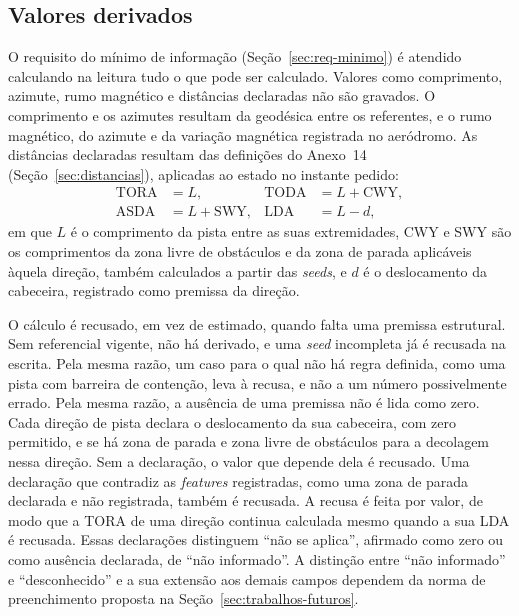 \subsection{Valores derivados}\label{sec:derivados}

O requisito do mínimo de informação (Seção~\ref{sec:req-minimo}) é atendido calculando na leitura tudo o que pode ser calculado. Valores como comprimento, azimute, rumo magnético e distâncias declaradas não são gravados. O comprimento e os azimutes resultam da geodésica entre os referentes, e o rumo magnético, do azimute e da variação magnética registrada no aeródromo. As distâncias declaradas resultam das definições do Anexo~14 (Seção~\ref{sec:distancias}), aplicadas ao estado no instante pedido:
\begin{equation}
    \begin{aligned}
        \mathrm{TORA} &= L, & \mathrm{TODA} &= L + \mathrm{CWY},\\
        \mathrm{ASDA} &= L + \mathrm{SWY}, & \mathrm{LDA} &= L - d,
    \end{aligned}
    \label{eq:distancias-declaradas}
\end{equation}
em que $L$ é o comprimento da pista entre as suas extremidades, CWY e SWY são os comprimentos da zona livre de obstáculos e da zona de parada aplicáveis àquela direção, também calculados a partir das \textit{seeds}, e $d$ é o deslocamento da cabeceira, registrado como premissa da direção.

O cálculo é recusado, em vez de estimado, quando falta uma premissa estrutural. Sem referencial vigente, não há derivado, e uma \textit{seed} incompleta já é recusada na escrita. Pela mesma razão, um caso para o qual não há regra definida, como uma pista com barreira de contenção, leva à recusa, e não a um número possivelmente errado. Pela mesma razão, a ausência de uma premissa não é lida como zero. Cada direção de pista declara o deslocamento da sua cabeceira, com zero permitido, e se há zona de parada e zona livre de obstáculos para a decolagem nessa direção. Sem a declaração, o valor que depende dela é recusado. Uma declaração que contradiz as \textit{features} registradas, como uma zona de parada declarada e não registrada, também é recusada. A recusa é feita por valor, de modo que a TORA de uma direção continua calculada mesmo quando a sua LDA é recusada. Essas declarações distinguem ``não se aplica'', afirmado como zero ou como ausência declarada, de ``não informado''. A distinção entre ``não informado'' e ``desconhecido'' e a sua extensão aos demais campos dependem da norma de preenchimento proposta na Seção~\ref{sec:trabalhos-futuros}.

